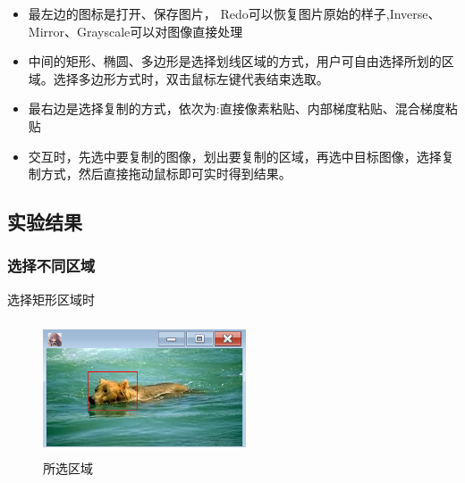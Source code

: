 \documentclass{article}
\begin{document}
      	\begin{itemize}
     	\item 最左边的图标是打开、保存图片， Redo可以恢复图片原始的样子,Inverse、Mirror、Grayscale可以对图像直接处理
     \end{itemize}

     \begin{itemize}
     	\item 中间的矩形、椭圆、多边形是选择划线区域的方式，用户可自由选择所划的区域。选择多边形方式时，双击鼠标左键代表结束选取。
     \end{itemize}
     \begin{itemize}
     	\item 最右边是选择复制的方式，依次为:直接像素粘贴、内部梯度粘贴、混合梯度粘贴
     \end{itemize}
     \begin{itemize}
     	\item 交互时，先选中要复制的图像，划出要复制的区域，再选中目标图像，选择复制方式，然后直接拖动鼠标即可实时得到结果。
     \end{itemize}
 
   \subsection{实验结果}
   
    \subsubsection{选择不同区域}
    
    选择矩形区域时
    
    	\begin{figure}[H]
    	\begin{center}
    		
    		\includegraphics[width=6cm,height=4cm]{rect1}
    		
    		\caption{所选区域} \label{rect1.label}
    	\end{center}
    \end{figure}
\end{document}
